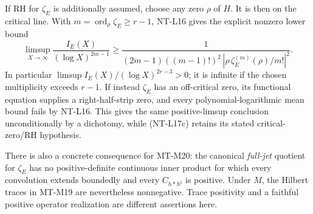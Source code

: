 If RH for $\zeta_E$ is additionally assumed, choose any zero $\rho$
of $H$. It is then on the critical line. With
$m=\operatorname{ord}_\rho\zeta_E\ge r-1$, NT-L16 gives the explicit
nonzero lower bound
\[
 \limsup_{X\to\infty}\frac{I_E(X)}{(\log X)^{2m-1}}
 \ge
 \frac1{(2m-1)((m-1)!)^2\,
             |\rho\,\zeta_E^{(m)}(\rho)/m!|^2}.
                                                        \tag{NT-L17c}
\]
In particular $\limsup I_E(X)/(\log X)^{2r-3}>0$; it is infinite
if the chosen multiplicity exceeds $r-1$. If instead $\zeta_E$
has an off-critical zero, its functional equation supplies a
right-half-strip zero, and every polynomial-logarithmic mean bound
fails by NT-L16. This gives the same positive-limsup conclusion
unconditionally by a dichotomy, while (NT-L17c) retains its stated
critical-zero/RH hypothesis.

There is also a concrete consequence for MT-M20: the canonical
\emph{full-jet} quotient for $\zeta_E$ has no positive-definite
continuous inner product for which every convolution extends boundedly
and every $C_{h*h^\sharp}$ is positive. Under $M$, the Hilbert traces
in MT-M19 are nevertheless nonnegative. Trace positivity and a faithful
positive operator realization are different assertions here.

